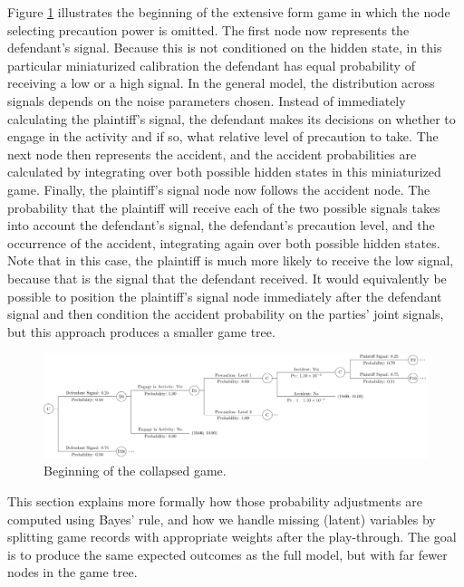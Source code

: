 \documentclass{article}
\begin{document}
Figure \ref{fig:smalltree_collapsed_beginning} illustrates the beginning of the extensive form game in which the node selecting precaution power is omitted. The first node now represents the defendant's signal. Because this is not conditioned on the hidden state, in this particular miniaturized calibration the defendant has equal probability of receiving a low or a high signal. In the general model, the distribution across signals depends on the noise parameters chosen. Instead of immediately calculating the plaintiff's signal, the defendant makes its decisions on whether to engage in the activity and if so, what relative level of precaution to take. The next node then represents the accident, and the accident probabilities are calculated by integrating over both possible hidden states in this miniaturized game. Finally, the plaintiff's signal node now follows the accident node. The probability that the plaintiff will receive each of the two possible signals takes into account the defendant's signal, the defendant's precaution level, and the occurrence of the accident, integrating again over both possible hidden states. Note that in this case, the plaintiff is much more likely to receive the low signal, because that is the signal that the defendant received. It would equivalently be possible to position the plaintiff's signal node immediately after the defendant signal and then condition the accident probability on the parties' joint signals, but this approach produces a smaller game tree.

  \begin{figure}[t]
    \centering
    \includegraphics[width=\textwidth]{../Figures/smalltree_collapsed_beginning.pdf}
    \caption{Beginning of the collapsed game.}
    \label{fig:smalltree_collapsed_beginning}
  \end{figure}

This section explains more formally how those probability adjustments are computed using Bayes’ rule, and how we handle missing (latent) variables by splitting game records with appropriate weights after the play-through. The goal is to produce the same expected outcomes as the full model, but with far fewer nodes in the game tree.
\end{document}

